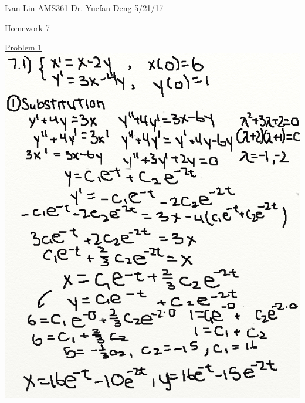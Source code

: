 \documentclass{article}
\begin{document}
Ivan Lin\newline{}
AMS361\newline{}
Dr. Yuefan Deng\newline{}
5/21/17\newline{}

\begin{center}
  Homework 7
\end{center}

\underline{Problem 1}\newline{}
\includegraphics[width=\textwidth,height=\textheight,keepaspectratio]{homework7q1p1.png}\clearpage{}
\end{document}
